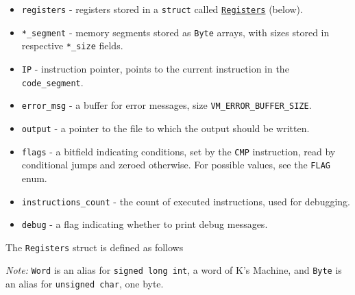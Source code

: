 \documentclass[12pt,a4paper]{paper}
\newcommand{\code}[1]{\texttt{#1}}
\begin{document}
\begin{itemize}
    \item \code{registers} - registers stored in a \code{struct} called
        \hyperlink{registers}{\code{Registers}} (below). 
    \item \code{*_segment} - memory segments stored as \code{Byte} arrays, with
        sizes stored in respective \code{*_size} fields.
    \item \code{IP} - instruction pointer, points to the current instruction in
        the \code{code_segment}.
    \item \code{error_msg} - a buffer for error messages, size
        \code{VM_ERROR_BUFFER_SIZE}.
    \item \code{output} - a pointer to the file to which the output should be
        written.
    \item \code{flags} - a bitfield indicating conditions, set by the \code{CMP}
        instruction, read by conditional jumps and zeroed otherwise. For
        possible values, see the \code{FLAG} enum.
    \item \code{instructions_count} - the count of executed instructions, used
        for debugging.
    \item \code{debug} - a flag indicating whether to print debug messages.
\end{itemize}

The \hypertarget{registers}{\code{Registers}} struct is defined as follows 

\begin{center}
\end{center}

\textit{Note:} \code{Word} is an alias for \code{signed long int}, a word of
K's Machine, and \code{Byte} is an alias for \code{unsigned char}, one byte.
\end{document}
